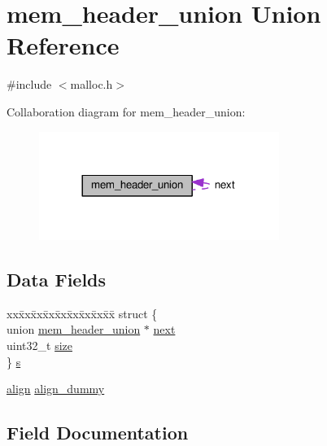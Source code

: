 \hypertarget{unionmem__header__union}{}\section{mem\+\_\+header\+\_\+union Union Reference}
\label{unionmem__header__union}


{\ttfamily \#include $<$malloc.\+h$>$}



Collaboration diagram for mem\+\_\+header\+\_\+union\+:\nopagebreak
\begin{figure}[H]
\begin{center}
\leavevmode
\includegraphics[width=221pt]{unionmem__header__union__coll__graph}
\end{center}
\end{figure}
\subsection*{Data Fields}
\begin{DoxyCompactItemize}
\item 
\begin{tabbing}
xx\=xx\=xx\=xx\=xx\=xx\=xx\=xx\=xx\=\kill
struct \{\\
\>union \hyperlink{unionmem__header__union}{mem\_header\_union} $\ast$ \hyperlink{unionmem__header__union_a22eb41be35488312c1e42462d5679d64}{next}\\
\>uint32\_t \hyperlink{unionmem__header__union_ab0a6578a8d52fd76a933d21273e73e08}{size}\\
\} \hyperlink{unionmem__header__union_a8e9bc77f2cf7596a7503f50ef29019f9}{s}\\

\end{tabbing}\item 
\hyperlink{malloc_8h_a1e0a98b5055eebe08414396335357f7f}{align} \hyperlink{unionmem__header__union_a5ca4f0da25cd2b76029162df7bdb537c}{align\+\_\+dummy}
\end{DoxyCompactItemize}


\subsection{Field Documentation}
\mbox{\label{unionmem__header__union_a5ca4f0da25cd2b76029162df7bdb537c}} 
